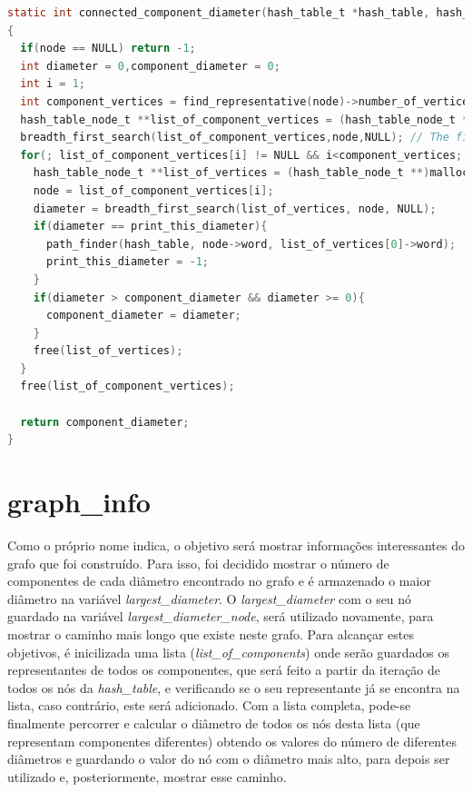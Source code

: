 	\begin{lstlisting}[language=C]
static int connected_component_diameter(hash_table_t *hash_table, hash_table_node_t *node, int print_this_diameter)
{
  if(node == NULL) return -1;
  int diameter = 0,component_diameter = 0;
  int i = 1;
  int component_vertices = find_representative(node)->number_of_vertices;
  hash_table_node_t **list_of_component_vertices = (hash_table_node_t **)malloc(sizeof(hash_table_node_t) * component_vertices);
  breadth_first_search(list_of_component_vertices,node,NULL); // The first breadth first search that will save all vertices on list_of_vertices
  for(; list_of_component_vertices[i] != NULL && i<component_vertices; i++){
    hash_table_node_t **list_of_vertices = (hash_table_node_t **)malloc(sizeof(hash_table_node_t) * component_vertices);
    node = list_of_component_vertices[i];
    diameter = breadth_first_search(list_of_vertices, node, NULL);
    if(diameter == print_this_diameter){
      path_finder(hash_table, node->word, list_of_vertices[0]->word);
      print_this_diameter = -1;
    }
    if(diameter > component_diameter && diameter >= 0){ 
      component_diameter = diameter;
    }
    free(list_of_vertices);
  }
  free(list_of_component_vertices);

  return component_diameter;
}
	\end{lstlisting}
	\section{graph\_info}
	\label{graphinfo}
Como o próprio nome indica, o objetivo será mostrar informações interessantes do grafo que foi construído.
Para isso, foi decidido mostrar o número de componentes de cada diâmetro encontrado no grafo e é armazenado o maior diâmetro na variável \textit{largest\_diameter}.
O \textit{largest\_diameter} com o seu nó guardado na variável \textit{largest\_diameter\_node}, será utilizado novamente, para mostrar
o caminho mais longo que existe neste grafo.
Para alcançar estes objetivos, é inicilizada uma lista (\textit{list\_of\_components}) onde serão guardados os representantes de todos os componentes, 
que será feito a partir da iteração de todos os nós da \textit{hash\_table}, e verificando se o seu representante já se encontra na lista, caso contrário, este será adicionado.
Com a lista completa, pode-se finalmente percorrer e calcular o diâmetro de todos os nós desta lista (que representam componentes diferentes) obtendo os valores do número de diferentes diâmetros e guardando o valor do nó com o diâmetro mais alto, para depois ser utilizado e, posteriormente, mostrar esse caminho.

